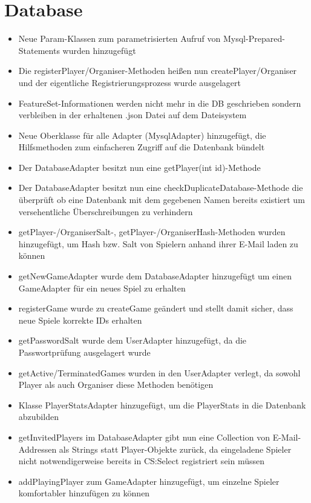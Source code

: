 \documentclass[a4paper]{scrreprt}
\begin{document}
\section{Database}
\begin{itemize}
    \item Neue Param-Klassen zum parametrisierten Aufruf von Mysql-Prepared-Statements wurden hinzugefügt
    \item Die registerPlayer/Organiser-Methoden heißen nun createPlayer/Organiser und der eigentliche Registrierungsprozess wurde ausgelagert
    \item FeatureSet-Informationen werden nicht mehr in die DB geschrieben sondern verbleiben in der erhaltenen .json Datei auf dem Dateisystem
    \item Neue Oberklasse für alle Adapter (MysqlAdapter) hinzugefügt, die Hilfsmethoden zum einfacheren Zugriff auf die Datenbank bündelt
    \item Der DatabaseAdapter besitzt nun eine getPlayer(int id)-Methode
    \item Der DatabaseAdapter besitzt nun eine checkDuplicateDatabase-Methode die überprüft ob eine Datenbank mit dem gegebenen Namen bereits existiert um versehentliche Überschreibungen zu verhindern
    \item getPlayer-/OrganiserSalt-, getPlayer-/OrganiserHash-Methoden wurden hinzugefügt, um Hash bzw. Salt von Spielern anhand ihrer E-Mail laden zu können
    \item getNewGameAdapter wurde dem DatabaseAdapter hinzugefügt um einen GameAdapter für ein neues Spiel zu erhalten
    \item registerGame wurde zu createGame geändert und stellt damit sicher, dass neue Spiele korrekte IDs erhalten
    \item getPasswordSalt wurde dem UserAdapter hinzugefügt, da die Passwortprüfung ausgelagert wurde
    \item getActive/TerminatedGames wurden in den UserAdapter verlegt, da sowohl Player als auch Organiser diese Methoden benötigen
    \item Klasse PlayerStatsAdapter hinzugefügt, um die PlayerStats in die Datenbank abzubilden
    \item getInvitedPlayers im DatabaseAdapter gibt nun eine Collection von E-Mail-Addressen als Strings statt Player-Objekte zurück, da eingeladene Spieler nicht notwendigerweise bereits in CS:Select registriert sein müssen
    \item addPlayingPlayer zum GameAdapter hinzugefügt, um einzelne Spieler komfortabler hinzufügen zu können
\end{itemize}
\end{document}
